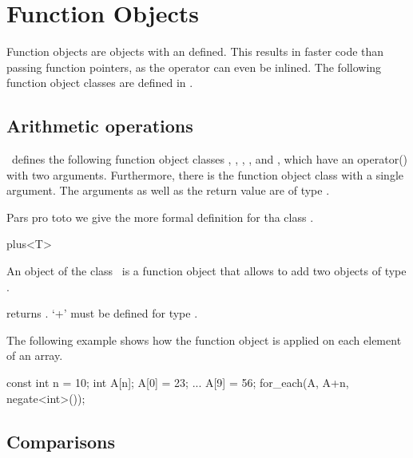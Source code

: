 
\cleardoublepage
\chapter{Function Objects}

Function objects are objects with an  defined. This results
in faster code than passing function pointers, as the operator can
even be inlined. The following function object classes are defined in \stl.

\section{Arithmetic operations}

\ccHtmlLinksOff
{}
\ccHtmlLinksOn

\stl\  defines the following function object classes ,
, , , and
, which have an operator() with two arguments. 
Furthermore, there is the function object class  with
a single argument. The arguments as well as the return value are of
type .

Pars pro toto we give the more formal definition for tha class .

\begin{ccClassTemplate}{plus<T>}

\ccDefinition
An object of the class \ccClassName\ is a function object that allows
to add two objects of type .


\ccOperations

{returns .
\ccPrecond `+' must be defined for type .}
\end{ccClassTemplate} 


\ccExample

The following example shows how the function object 
is applied on each element of an array.

\begin{cprog}
{
    const int n = 10;
    int A[n];
    A[0] = 23;
    ...
    A[9] = 56;
    for_each(A, A+n, negate<int>());
}
\end{cprog}

\newpage

\section{Comparisons}

